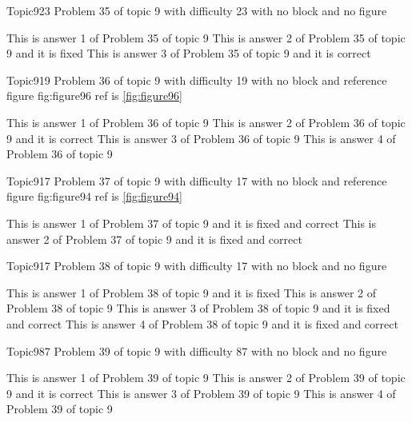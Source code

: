 \documentclass[master]{exam}
\begin{document}
\begin{problem}{Topic9}{23}
	Problem 35 of topic 9 with difficulty 23 with no block and no figure
	\begin{answers}
		\answer This is answer 1 of Problem 35 of topic 9 
		\answer[fixed] This is answer 2 of Problem 35 of topic 9 and it is fixed
		\answer[correct] This is answer 3 of Problem 35 of topic 9 and it is correct
	\end{answers}
\end{problem}

\begin{problem}{Topic9}{19}
	Problem 36 of topic 9 with difficulty 19 with no block and reference figure fig:figure96 ref is \ref{fig:figure96}
	\begin{answers}
		\answer This is answer 1 of Problem 36 of topic 9 
		\answer[correct] This is answer 2 of Problem 36 of topic 9 and it is correct
		\answer This is answer 3 of Problem 36 of topic 9 
		\answer This is answer 4 of Problem 36 of topic 9 
	\end{answers}
\end{problem}

\begin{problem}{Topic9}{17}
	Problem 37 of topic 9 with difficulty 17 with no block and reference figure fig:figure94 ref is \ref{fig:figure94}
	\begin{answers}
		 This is answer 1 of Problem 37 of topic 9 and it is fixed and correct
		 This is answer 2 of Problem 37 of topic 9 and it is fixed and correct
	\end{answers}
\end{problem}

\begin{problem}{Topic9}{17}
	Problem 38 of topic 9 with difficulty 17 with no block and no figure
	\begin{answers}
		\answer[fixed] This is answer 1 of Problem 38 of topic 9 and it is fixed
		\answer This is answer 2 of Problem 38 of topic 9 
		 This is answer 3 of Problem 38 of topic 9 and it is fixed and correct
		 This is answer 4 of Problem 38 of topic 9 and it is fixed and correct
	\end{answers}
\end{problem}

\begin{problem}{Topic9}{87}
	Problem 39 of topic 9 with difficulty 87 with no block and no figure
	\begin{answers}
		\answer This is answer 1 of Problem 39 of topic 9 
		\answer[correct] This is answer 2 of Problem 39 of topic 9 and it is correct
		\answer This is answer 3 of Problem 39 of topic 9 
		\answer This is answer 4 of Problem 39 of topic 9 
	\end{answers}
\end{problem}
\end{document}

